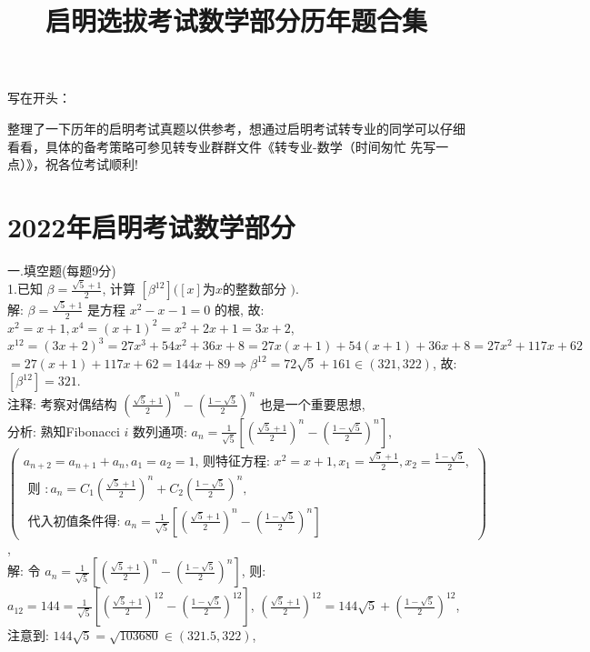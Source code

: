 \documentclass[a4paper,11pt,UTF8]{article}
\title{启明选拔考试数学部分历年题合集}
\author{}
\begin{document}
\maketitle
\noindent
写在开头：

整理了一下历年的启明考试真题以供参考，想通过启明考试转专业的同学可以仔细看看，具体的备考策略可参见转专业群群文件《转专业-数学（时间匆忙 先写一点）》，祝各位考试顺利!
\section*{2022年启明考试数学部分}
\noindent
一.填空题(每题9分)\\
1.已知 $\displaystyle\beta=\frac{\sqrt{5}+1}{2}$, 计算 $\left[\beta^{12}\right]([x]$为$x$的整数部分 $)$.\\
解: $\displaystyle\beta=\frac{\sqrt{5}+1}{2}$ 是方程 $x^2-x-1=0$ 的根, 故: $x^2=x+1, x^4=(x+1)^2=x^2+2 x+1=3 x+2$, $x^{12}=(3 x+2)^3=27 x^3+54 x^2+36 x+8=27 x(x+1)+54(x+1)+36 x+8=27 x^2+117 x+62$ $=27(x+1)+117 x+62=144 x+89 \Rightarrow \beta^{12}=72 \sqrt{5}+161 \in(321,322)$, 故: $\left[\beta^{12}\right]=321$.\\
注释: 考察对偶结构 $\displaystyle\left(\frac{\sqrt{5}+1}{2}\right)^n-\left(\frac{1-\sqrt{5}}{2}\right)^n$ 也是一个重要思想,\\
分析: 熟知Fibonacci $i$ 数列通项: $\displaystyle a_n=\frac{1}{\sqrt{5}}\left[\left(\frac{\sqrt{5}+1}{2}\right)^n-\left(\frac{1-\sqrt{5}}{2}\right)^n\right]$,\\
$\displaystyle\left(\begin{array}{l}\displaystyle a_{n+2}=a_{n+1}+a_n, a_1=a_2=1 \text {, 则特征方程: } x^2=x+1, x_1=\frac{\sqrt{5}+1}{2}, x_2=\frac{1-\sqrt{5}}{2}, \\ \text { 则 }: \displaystyle a_n=C_1\left(\frac{\sqrt{5}+1}{2}\right)^n+C_2\left(\frac{1-\sqrt{5}}{2}\right)^n,\\
\text { 代入初值条件得: } \displaystyle a_n=\frac{1}{\sqrt{5}}\left[\left(\frac{\sqrt{5}+1}{2}\right)^n-\left(\frac{1-\sqrt{5}}{2}\right)^n\right]\end{array}\right)$,\\
解: 令 $\displaystyle a_n=\frac{1}{\sqrt{5}}\left[\left(\frac{\sqrt{5}+1}{2}\right)^n-\left(\frac{1-\sqrt{5}}{2}\right)^n\right]$, 则:\\ $\displaystyle a_{12}=144=\frac{1}{\sqrt{5}}\left[\left(\frac{\sqrt{5}+1}{2}\right)^{12}-\left(\frac{1-\sqrt{5}}{2}\right)^{12}\right]$,
$\displaystyle\left(\frac{\sqrt{5}+1}{2}\right)^{12}=144 \sqrt{5}+\left(\frac{1-\sqrt{5}}{2}\right)^{12}$, 注意到: $144 \sqrt{5}=\sqrt{103680} \in(321.5,322)$,
\end{document}
